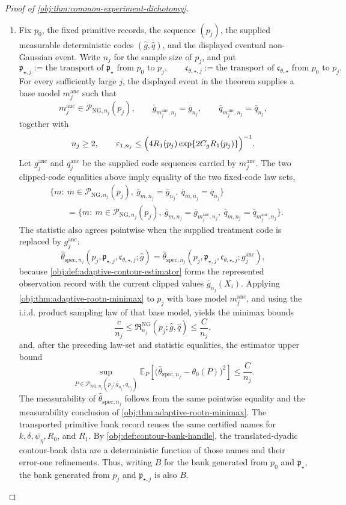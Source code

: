 \documentclass[11pt]{article}
\begin{document}
\begin{proof}[Proof of \cref{obj:thm:common-experiment-dichotomy}]
\begin{enumerate}
\item
Fix \(p_0\), the fixed primitive records, the sequence \((p_j)\), the supplied measurable deterministic codes \((\widehat g,\widehat q)\), and the displayed eventual non-Gaussian event. Write \(n_j\) for the sample size of \(p_j\), and put
\[
\mathfrak p_{\star,j}:=\text{the transport of }\mathfrak p_{\star}\text{ from }p_0\text{ to }p_j,
\qquad
\mathfrak c_{\theta,\star,j}:=\text{the transport of }\mathfrak c_{\theta,\star}\text{ from }p_0\text{ to }p_j.
\]
For every sufficiently large \(j\), the displayed event in the theorem supplies a base model
\(m_j^{\mathrm{anc}}\) such that
\[
m_j^{\mathrm{anc}}\in\mathcal P_{\mathrm{NG},n_j}(p_j),
\qquad
\bar g_{m_j^{\mathrm{anc}},n_j}=\bar g_{n_j},
\qquad
\bar q_{m_j^{\mathrm{anc}},n_j}=\bar q_{n_j},
\]
together with
\[
n_j\ge2,
\qquad
\varepsilon_{1,n_j}\le
\Bigl(4R_1(p_j)\exp\{2C_gR_1(p_j)\}\Bigr)^{-1}.
\]
Let \(g_j^{\mathrm{anc}}\) and \(q_j^{\mathrm{anc}}\) be the supplied code sequences carried by
\(m_j^{\mathrm{anc}}\). The two clipped-code equalities above imply equality of the two fixed-code law sets,
\[
\begin{aligned}
&\{m:\ m\in\mathcal P_{\mathrm{NG},n_j}(p_j),\ \bar g_{m,n_j}=\bar g_{n_j},\ \bar q_{m,n_j}=\bar q_{n_j}\}  \\
&\qquad =
\{m:\ m\in\mathcal P_{\mathrm{NG},n_j}(p_j),\ \bar g_{m,n_j}=\bar g_{m_j^{\mathrm{anc}},n_j},\ \bar q_{m,n_j}=\bar q_{m_j^{\mathrm{anc}},n_j}\}.
\end{aligned}
\]
The statistic also agrees pointwise when the supplied treatment code is replaced by
\(g_j^{\mathrm{anc}}\):
\[
\widehat\theta_{\mathrm{spec},n_j}
(p_j,\mathfrak p_{\star,j},\mathfrak c_{\theta,\star,j};\widehat g)
=
\widehat\theta_{\mathrm{spec},n_j}
(p_j,\mathfrak p_{\star,j},\mathfrak c_{\theta,\star,j};g_j^{\mathrm{anc}}),
\]
because \cref{obj:def:adaptive-contour-estimator} forms the represented observation record with the current clipped values \(\bar g_{n_j}(X_i)\). Applying \cref{obj:thm:adaptive-rootn-minimax} to \(p_j\) with base model
\(m_j^{\mathrm{anc}}\), and using the i.i.d. product sampling law of that base model, yields the minimax bounds
\[
\frac{c}{n_j}
\le
\mathfrak R_{n_j}^{\mathrm{NG}}(p_j;\widehat g,\widehat q)
\le
\frac{C}{n_j},
\]
and, after the preceding law-set and statistic equalities, the estimator upper bound
\[
\sup_{P\in\mathcal P_{\mathrm{NG},n_j}(p_j;\bar g_{n_j},\bar q_{n_j})}
\mathbb E_P\!\left[
\bigl(\widehat\theta_{\mathrm{spec},n_j}-\theta_0(P)\bigr)^2
\right]
\le
\frac{C}{n_j}.
\]
The measurability of
\(\widehat\theta_{\mathrm{spec},n_j}\) follows from the same pointwise equality and the measurability conclusion of
\cref{obj:thm:adaptive-rootn-minimax}. The transported primitive bank record reuses the same certified names for
\(k,\delta,\psi_{\eta},R_0\), and \(R_1\). By \cref{obj:def:contour-bank-handle}, the translated-dyadic contour-bank data are a deterministic function of those names and their error-one refinements. Thus, writing
\(B\) for the bank generated from \(p_0\) and \(\mathfrak p_{\star}\), the bank generated from
\(p_j\) and \(\mathfrak p_{\star,j}\) is also \(B\).


\end{enumerate}
\end{proof}
\end{document}

